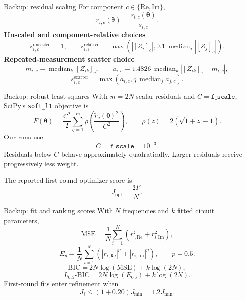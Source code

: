 \documentclass[aspectratio=169,12pt]{beamer}
\begin{document}
\begin{frame}{Backup: residual scaling}
  \small
  For component $c\in\{\mathrm{Re},\mathrm{Im}\}$,
  \[
    \widetilde r_{i,c}(\boldsymbol{\theta})
      = \frac{r_{i,c}(\boldsymbol{\theta})}{s_{i,c}}.
  \]
  \textbf{Unscaled and component-relative choices}
  \[
    s_{i,c}^{\mathrm{unscaled}}=1,
    \qquad
    s_{i,c}^{\mathrm{relative}}
      =\max\!\left(
        |[Z_i]_c|,
        0.1\,\operatorname{median}_{j}|[Z_j]_c|
      \right).
  \]
  \textbf{Repeated-measurement scatter choice}
  \[
    m_{i,c}=\operatorname{median}_{k}[Z_{ik}]_c,
    \qquad
    a_{i,c}=1.4826\,\operatorname{median}_{k}
      \left|[Z_{ik}]_c-m_{i,c}\right|,
  \]
  \[
    s_{i,c}^{\mathrm{scatter}}
      =\max\!\left(
        a_{i,c},
        \eta\,\operatorname{median}_{j}a_{j,c}
      \right).
  \]
\end{frame}

\begin{frame}{Backup: robust least squares}
  \small
  With $m=2N$ scalar residuals and $C=\texttt{f\_scale}$, SciPy's
  \texttt{soft\_l1} objective is
  \[
    F(\boldsymbol{\theta})
      =\frac{C^2}{2}\sum_{q=1}^{m}
       \rho\!\left(
         \frac{\widetilde r_q(\boldsymbol{\theta})^2}{C^2}
       \right),
    \qquad
    \rho(z)=2\left(\sqrt{1+z}-1\right).
  \]
  Our runs use
  \[
    C=\texttt{f\_scale}=10^{-3}.
  \]
  Residuals below $C$ behave approximately quadratically. Larger residuals
  receive progressively less weight.

  \vspace{0.5em}
  The reported first-round optimizer score is
  \[
    J_{\mathrm{opt}}=\frac{2F}{N}.
  \]
\end{frame}

\begin{frame}{Backup: fit and ranking scores}
  \small
  With $N$ frequencies and $k$ fitted circuit parameters,
  \[
    \mathrm{MSE}
      =\frac{1}{N}\sum_{i=1}^{N}
       \left(r_{i,\mathrm{Re}}^2+r_{i,\mathrm{Im}}^2\right),
  \]
  \[
    E_p
      =\frac{1}{N}\sum_{i=1}^{N}
       \left(|r_{i,\mathrm{Re}}|^p+|r_{i,\mathrm{Im}}|^p\right),
    \qquad p=0.5.
  \]
  \[
    \mathrm{BIC}=2N\log(\mathrm{MSE})+k\log(2N),
  \]
  \[
    L_{0.5}\text{-}\mathrm{BIC}
      =2N\log(E_{0.5})+k\log(2N).
  \]
  First-round fits enter refinement when
  \[
    J_i\le(1+0.20)J_{\min}=1.2J_{\min}.
  \]
\end{frame}
\end{document}
